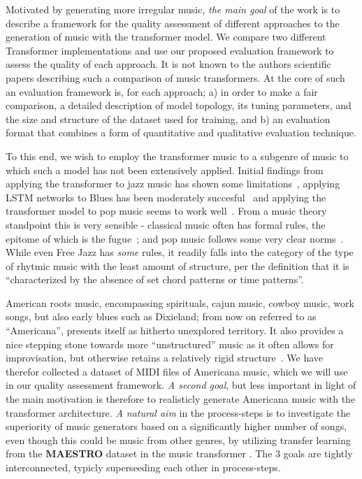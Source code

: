 \documentclass{IEEEtran}
\begin{document}
Motivated by generating more irregular music, \emph{the main goal} of the
work is to describe a framework for the quality assessment of different
approaches to the generation of music with the transformer model. We compare
two different Transformer implementations and use our proposed evaluation
framework to assess the quality of each approach. It is not known to the
authors scientific papers describing such a comparison of music transformers.
At the core of such an evaluation framework is, for each approach; a) in
order to make a fair comparison, a detailed description of model topology,
its tuning parameters, and the size and structure of the dataset used for
training, and b) an evaluation format that combines a form of quantitative
and qualitative evaluation technique.

To this end, we wish to employ the transformer music to a subgenre of music
to which such a model has not been extensively applied. Initial findings from
applying the transformer to jazz music has shown some
limitations~\cite{wu2020jazz}, applying LSTM networks to Blues has been
moderately succesful~\cite{eck2002bluesLSTM} and applying the transformer
model to pop music seems to work well~\cite{huang2020pop}. From a music
theory standpoint this is very sensible - classical music often has formal
rules, the epitome of which is the fugue~\cite{giraud2015computational}; and
pop music follows some very clear norms~\cite{hennion1983production}. While
even Free Jazz has \emph{some} rules, it readily falls into the category of
the type of rhytmic music with the least amount of structure, per the
definition that it is ``characterized by the absence of set chord patterns or
time patterns''\cite{FreeJazz}.

American roots music, encompassing spirituals, cajun music, cowboy music,
work songs, but also early blues such as Dixieland; from now on referred to
as ``Americana'', presents itself as hitherto unexplored territory. It also
provides a nice stepping stone towards more ``unstructured'' music as it
often allows for improvisation, but otherwise retains a relatively rigid
structure~\cite{libcong}. We have therefor collected a dataset of MIDI files
of Americana music, which we will use in our quality assessment framework.
\emph{A second goal}, but less important in light of the main motivation is
therefore to realisticly generate Americana music with the transformer
architecture. \emph{A natural aim} in the process-steps is to investigate the
superiority of music generators based on a significantly higher number of
songs, even though this could be music from other genres, by utilizing
transfer learning from the \textbf{MAESTRO} dataset in the music transformer
\cite{huang2018music}. The 3 goals are tightly interconnected, typicly
superseeding each other in process-steps.
\end{document}
